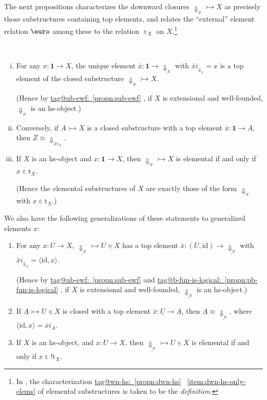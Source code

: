 \documentclass{amsart}
\makeatletter
\newcommand\br[1]{\langle{}#1\rangle{}}
\newcommand\Dwn{{\Downarrow}}
\newcommand\Ein{\mathrel{\text{\textup{\euro}}}}
\newcommand\ein{\mathrel{\varepsilon}}
\newcommand\enumbelow{\ }
\newcommand\id{\mathrm{id}}
\newcommand\rt{\mathrm{t}}
\newcommand\tm{\mathbf{1}}
\newcommand\tto{\rightarrowtail}
\newcommand\und[1]{\underline{#1}}
\newcommand\unein{{\ein}}
\newcommand\unEin{{\Ein}}
\newcommand\unex{{!}}
\newcommand\prooflabel[1]{\gdef\proof@label{#1}}
\def\proof@label{}
\newcommand\tagword[1]{\csname tag@#1\endcsname}
\def\label@tag#1:#2\@nil{#1}
\newcommand\labeltag[1]{\label@tag#1:\@nil}
\newcommand\jref[1]{%
  \texorpdfstring%
    {\hyperref[#1]{\tagword{\labeltag{#1}}~\ref*{#1}}}%
    {\tagword{\labeltag{#1}}~\ref*{#1}}%
}
\theoremstyle{definition}
\theoremstyle{remark}
\theoremstyle{plainwithref}
\makeatother
\begin{document}
The next propositions characterizes the downward closures \( \Dwn_x \tto X \) as precisely those substructures containing top elements, and relates the ``external'' element relation \( \unEin \) among these to the relation \( \unein_X \) on \( X \).\footnote{%
  In \cite[Definition~8.17]{shulman-comparing}, the characterization \jref{propn:dwn-hs}~\ref{item:dwn-hs-only-elems} of elemental substructures is taken to be the \emph{definition}.
}
\prooflabel{proof:dwn-hs}
\begin{propn} \label{propn:dwn-hs}\enumbelow
\begin{enumerate}[(i)]
\item\label{item:dwn-hs-top-elem} \label{item:dwn-hs-first} For any \( x \colon \tm \to X \), the unique element \( \bar x \colon \tm \to \Dwn_x \) with \( \bar x i_{\Dwn_x} = x \) is a top element of the closed substructure \( \Dwn_x \tto X \).

  \noindent
  (Hence by \jref{propn:sub-ewf}, if \( X \) is extensional and well-founded, \( \Dwn_x \) is an hs-object.)
\item \label{item:dwn-hs-closed-is-dwn}
  Conversely, if \( A \tto X \) is a closed substructure with a top element \( \bar x \colon \tm \to A \), then \( Z \approx \Dwn_{\bar x i_A} \).
\item \label{item:dwn-hs-only-elems}
  \label{item:dwn-hs-last}
  If \( X \) is an hs-object and \( x \colon \tm \to X \), then \( \Dwn_x \tto X \) is elemental if and only if \( x \ein \rt_X \).

  \noindent
  (Hence the elemental substructures of \( X \) are exactly those of the form \( \Dwn_x \) with \( x \ein \rt_X \).)
\end{enumerate}

We also have the following generalizations of these statements to generalized elements \( x \):
\begin{enumerate}[(i\('\))]
\item \label{item:dwn-hs-top-elem-gen} \label{item:dwn-hs-first-gen}
  For any \( x \colon U \to X \), \( \und{\Dwn_x} \tto \und{U \times X} \) has a top element \( \bar x \colon (U, \id) \to \und{\Dwn_x} \) with \( \bar x i_{\Dwn_x} = \br{\id, x} \).

    \noindent
    (Hence by \jref{propn:sub-ewf} and \jref{propn:pb-fun-is-logical}, if \( X \) is extensional and well-founded, \( \und{\Dwn_x} \) is an hs-object.)
  \item \label{item:dwn-hs-closed-is-dwn-gen}
    If \( \und A \tto \und{U \times X} \) is closed with a top element \( \bar x \colon \und U \to \und A \), then \( \und A \approx \und{\Dwn_{x}} \), where \( \br{\id, x} = \bar x i_A \).
  \item \label{item:dwn-hs-only-elems-gen} \label{item:dwn-hs-last-gen}
    If \( X \) is an hs-object, and \( x \colon U \to X \), then \( \und{\Dwn_x} \tto \und{U \times X} \) is elemental if and only if \( x \ein \unex \rt_X \).
  \end{enumerate}
\end{propn}
\end{document}
